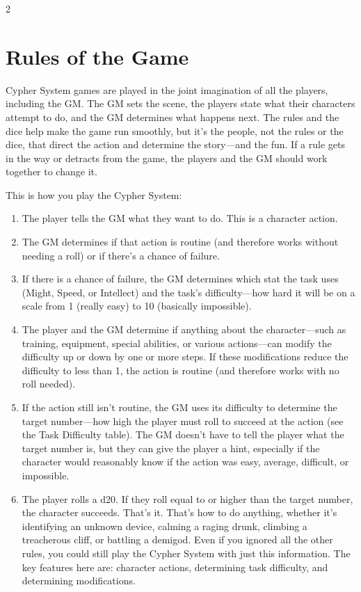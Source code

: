 \begin{multicols}{2}

\chapter{Rules of the Game}

Cypher System games are played in the joint imagination of all the players, including the GM. The GM sets the scene, the players state what their characters attempt to do, and the GM determines what happens next. The rules and the dice help make the game run smoothly, but it’s the people, not the rules or the dice, that direct the action and determine the story—and the fun. If a rule gets in the way or detracts from the game, the players and the GM should work together to change it.

This is how you play the Cypher System:

\begin{enumerate} 
\item The player tells the GM what they want to do. This is a character action.

\item The GM determines if that action is routine (and therefore works without needing a roll) or if there’s a chance of failure.

\item If there is a chance of failure, the GM determines which stat the task uses (Might, Speed, or Intellect) and the task’s difficulty—how hard it will be on a scale from 1 (really easy) to 10 (basically impossible).

\item The player and the GM determine if anything about the character—such as training, equipment, special abilities, or various actions—can modify the difficulty up or down by one or more steps. If these modifications reduce the difficulty to less than 1, the action is routine (and therefore works with no roll needed).

\item If the action still isn’t routine, the GM uses its difficulty to determine the target number—how high the player must roll to succeed at the action (see the Task Difficulty table). The GM doesn’t have to tell the player what the target number is, but they can give the player a hint, especially if the character would reasonably know if the action was easy, average, difficult, or impossible.

\item The player rolls a d20. If they roll equal to or higher than the target number, the character succeeds.
That’s it. That’s how to do anything, whether it’s identifying an unknown device, calming a raging drunk, climbing a treacherous cliff, or battling a demigod. Even if you ignored all the other rules, you could still play the Cypher System with just this information. The key features here are: character actions, determining task difficulty, and determining modifications.
\end{enumerate}


\end{multicols}
